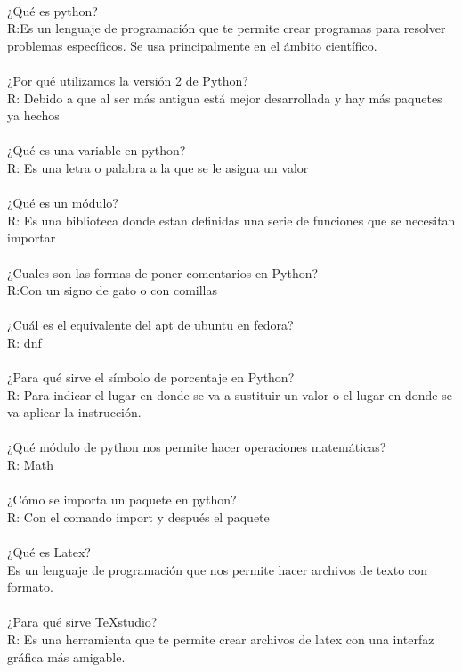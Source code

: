 \documentclass [letterpaper, 12 pts, oneside]{article}
\begin{document}
	\\
	¿Qué es python?\\
	R:Es un lenguaje de programación que te permite crear programas para resolver problemas específicos. Se usa principalmente en el ámbito científico. \\
	\\
	¿Por qué utilizamos la versión 2 de Python?\\
	R: Debido a que al ser más antigua está mejor desarrollada y hay más paquetes ya hechos\\
	\\
	¿Qué es una variable en python?\\
	R: Es una letra o palabra a la que se le asigna un valor\\
	\\
	¿Qué es un módulo?\\
	R: Es una biblioteca donde estan definidas una serie de funciones que se necesitan importar \\
	\\
	¿Cuales son las formas de poner comentarios en Python?\\
	R:Con un signo de gato o con comillas\\
	\\
	¿Cuál es el equivalente del apt de ubuntu en fedora?\\
	R: dnf\\
	\\
	¿Para qué sirve el símbolo de porcentaje en Python?\\
	R: Para indicar el lugar en donde se va a sustituir un valor o el lugar en donde se va  aplicar la instrucción.\\
	\\
	¿Qué módulo de python nos permite hacer operaciones matemáticas?\\
	R: Math\\
	\\
	¿Cómo se importa un paquete en python?\\
	R: Con el comando import y después el paquete\\
	\\
	¿Qué es Latex?\\
	Es un lenguaje de programación que nos permite hacer archivos de texto con formato.\\
	\\
	¿Para qué sirve TeXstudio?\\
	R: Es una herramienta que te permite crear archivos de latex con una interfaz gráfica más amigable.\\
	\\
	
\end{document}
